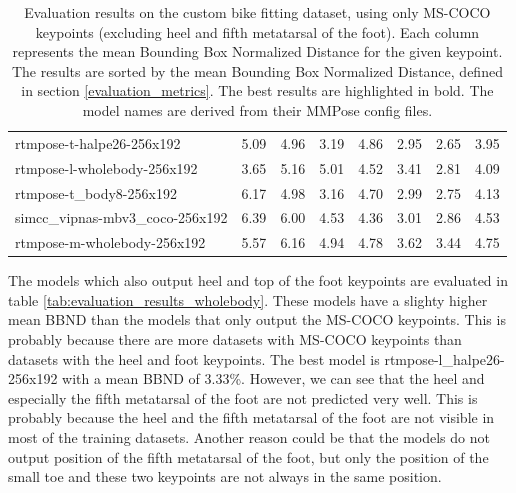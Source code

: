 \begin{table}[htbp]
\begin{tabular}{l ccccccc}
        rtmpose-t-halpe26-256x192        & 5.09           & 4.96          & 3.19          & 4.86              & 2.95           & 2.65           & 3.95          \\
        rtmpose-l-wholebody-256x192      & 3.65           & 5.16          & 5.01          & 4.52              & 3.41           & 2.81           & 4.09          \\
        rtmpose-t\_body8-256x192         & 6.17           & 4.98          & 3.16          & 4.70              & 2.99           & 2.75           & 4.13          \\
        simcc\_vipnas-mbv3\_coco-256x192 & 6.39           & 6.00          & 4.53          & 4.36              & 3.01           & 2.86           & 4.53          \\
        rtmpose-m-wholebody-256x192      & 5.57           & 6.16          & 4.94          & 4.78              & 3.62           & 3.44           & 4.75          \\
        \bottomrule
    \end{tabular}
    \caption{Evaluation results on the custom bike fitting dataset, using only MS-COCO keypoints (excluding heel and fifth metatarsal of the foot). Each column represents the mean Bounding Box Normalized Distance for the given keypoint. The results are sorted by the mean Bounding Box Normalized Distance, defined in section \ref{evaluation_metrics}. The best results are highlighted in bold. The model names are derived from their MMPose config files.}
    \label{tab:evaluation_results_coco}

\end{table}

The models which also output heel and top of the foot keypoints are evaluated in table \ref{tab:evaluation_results_wholebody}. These models have a slighty higher mean BBND than the models that only output the MS-COCO keypoints. This is probably because there are more datasets with MS-COCO keypoints than datasets with the heel and foot keypoints. The best model is rtmpose-l\_halpe26-256x192 with a mean BBND of 3.33\%. However, we can see that the heel and especially the fifth metatarsal of the foot are not predicted very well. This is probably because the heel and the fifth metatarsal of the foot are not visible in most of the training datasets. Another reason could be that the models do not output position of the fifth metatarsal of the foot, but only the position of the small toe and these two keypoints are not always in the same position.

